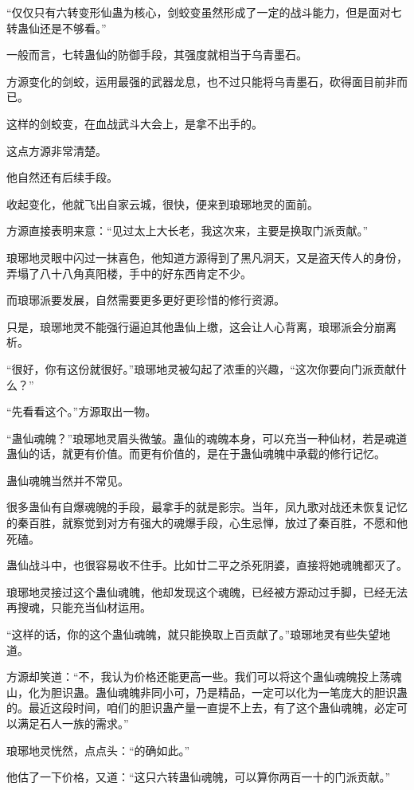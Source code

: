 \begin{this_body}
“仅仅只有六转变形仙蛊为核心，剑蛟变虽然形成了一定的战斗能力，但是面对七转蛊仙还是不够看。”

一般而言，七转蛊仙的防御手段，其强度就相当于乌青墨石。

方源变化的剑蛟，运用最强的武器龙息，也不过只能将乌青墨石，砍得面目前非而已。

这样的剑蛟变，在血战武斗大会上，是拿不出手的。

这点方源非常清楚。

他自然还有后续手段。

收起变化，他就飞出自家云城，很快，便来到琅琊地灵的面前。

方源直接表明来意：“见过太上大长老，我这次来，主要是换取门派贡献。”

琅琊地灵眼中闪过一抹喜色，他知道方源得到了黑凡洞天，又是盗天传人的身份，弄塌了八十八角真阳楼，手中的好东西肯定不少。

而琅琊派要发展，自然需要更多更好更珍惜的修行资源。

只是，琅琊地灵不能强行逼迫其他蛊仙上缴，这会让人心背离，琅琊派会分崩离析。

“很好，你有这份就很好。”琅琊地灵被勾起了浓重的兴趣，“这次你要向门派贡献什么？”

“先看看这个。”方源取出一物。

“蛊仙魂魄？”琅琊地灵眉头微皱。蛊仙的魂魄本身，可以充当一种仙材，若是魂道蛊仙的话，就更有价值。而更有价值的，是在于蛊仙魂魄中承载的修行记忆。

蛊仙魂魄当然并不常见。

很多蛊仙有自爆魂魄的手段，最拿手的就是影宗。当年，凤九歌对战还未恢复记忆的秦百胜，就察觉到对方有强大的魂爆手段，心生忌惮，放过了秦百胜，不愿和他死磕。

蛊仙战斗中，也很容易收不住手。比如廿二平之杀死阴婆，直接将她魂魄都灭了。

琅琊地灵接过这个蛊仙魂魄，他却发现这个魂魄，已经被方源动过手脚，已经无法再搜魂，只能充当仙材运用。

“这样的话，你的这个蛊仙魂魄，就只能换取上百贡献了。”琅琊地灵有些失望地道。

方源却笑道：“不，我认为价格还能更高一些。我们可以将这个蛊仙魂魄投上荡魂山，化为胆识蛊。蛊仙魂魄非同小可，乃是精品，一定可以化为一笔庞大的胆识蛊的。最近这段时间，咱们的胆识蛊产量一直提不上去，有了这个蛊仙魂魄，必定可以满足石人一族的需求。”

琅琊地灵恍然，点点头：“的确如此。”

他估了一下价格，又道：“这只六转蛊仙魂魄，可以算你两百一十的门派贡献。”

\end{this_body}


